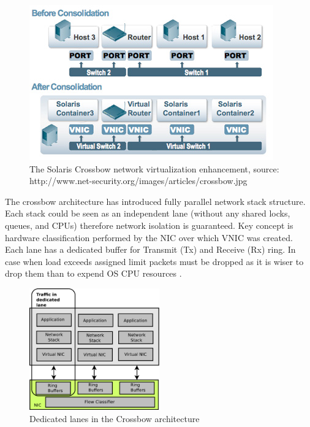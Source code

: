 \documentclass[11pt]{book}
\begin{document}
        \begin{figure}[H]
          \begin{center}
            \includegraphics[width=.7\textwidth]{img/crossbow.jpg}
          \end{center}

          \caption{The Solaris Crossbow network virtualization enhancement, source: http://www.net-security.org/images/articles/crossbow.jpg}
        \end{figure}

        The crossbow architecture has introduced fully parallel network stack structure. Each stack could be seen as
        an independent lane (without any shared locks, queues, and CPUs) therefore network isolation is guaranteed.
        Key concept is hardware classification performed by the NIC over which VNIC was created.  Each lane has a
        dedicated buffer for Transmit (Tx) and Receive (Rx) ring. In case when load exceeds assigned limit packets must
        be dropped as it is wiser to drop them than to expend OS CPU resources \cite{crossbow}.

        \begin{figure}[H]
          \begin{center}
            \includegraphics[width=0.5\textwidth]{img/crossbow-traffic-dedicated-line.pdf}
          \end{center}

          \caption{Dedicated lanes in the Crossbow architecture}
        \end{figure}
\end{document}

